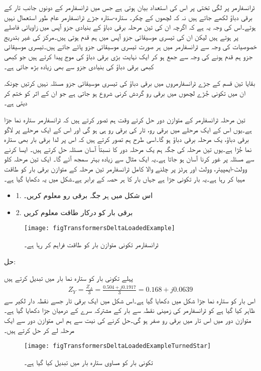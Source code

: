 	ٹرانسفارمر پر لگی تختی پر اس کی استعداد بیان ہوتی ہے جس میں ٹرانسفارمر کے دونوں جانب تار کے برقی دباؤ لکھے جاتے ہیں نہ کہ لچھوں کے چکر۔
%
ستارہ-ستارہ جڑے ٹرانسفارمر عام طور استعمال نہیں ہوتے۔اس کی وجہ یہ ہے کہ اگرچہ ان کی تین مرحلہ برقی دباؤ  کے بنیادی جزو آپس میں   زاویائی فاصلے پر ہوتے ہیں لیکن ان کی تیسری موسیقائی جزو آپس میں ہم قدم ہوتی ہیں۔مرکز کی غیر بتدریج خصوصیات کی وجہ سے ٹرانسفارمر میں ہر صورت تیسری موسیقائی جزو پائے جاتے ہیں۔تیسری موسیقائی جزو ہم قدم ہونے کی وجہ سے جمع ہو کر ایک نہایت بڑی برقی دباؤ کی موج پیدا کرتے ہیں جو کبھی کبھی برقی دباؤ کی بنیادی جزو سے بھی زیادہ بڑھ جاتی ہے۔

بقایا تین قسم کے جڑے ٹرانسفارمروں میں برقی دباؤ کی تیسری موسیقائی جزو مسئلہ نہیں کرتیں چونکہ ان میں تکونی جُڑے لچھوں میں برقی رو گردش کرنی شروع ہو جاتی ہے جو ان کے اثر کو ختم کر دیتی ہے۔

تین مرحلہ ٹرانسفارمر کے متوازن دور حل کرتے وقت ہم تصور کرتے ہیں کہ ٹرانسفارمر ستارہ نما جڑا  ہے۔یوں اس کے ایک مرحلے میں برقی رو، تار  کی برقی رو ہی ہو گی اور اس کے ایک مرحلے پر لاگو برقی دباؤ، یک مرحلہ برقی دباؤ  ہو گا۔اسی طرح ہم تصور کرتے ہیں کہ اس پر لدا برقی بار بھی ستارہ نما جُڑا ہے۔یوں تین مرحلہ کی جگہ ہم یک مرحلہ دور کا نسبتاً آسان مسئلہ حل کرتے ہیں۔ ایسا کرنے سے مسئلہ پر غور کرنا آسان ہو جاتا ہے۔یہ ایک مثال سے زیادہ بہتر سمجھ آئے گا۔
%
ایک تین مرحلہ     کلو وولٹ-ایمپیئر،    وولٹ اور  ہرٹز پر چلنے والا کامل ٹرانسفارمر تین مرحلہ کے متوازن برقی بار کو طاقت مہیا کر رہا ہے۔یہ بار تکونی جڑا ہے جہاں بار کا ہر حصہ  کے برابر ہے۔شکل   میں یہ دکھایا گیا ہے۔
\begin{itemize}
\item
1. اس شکل میں ہر جگہ برقی رو معلوم کریں۔
\item
2. برقی بار کو درکار طاقت معلوم کریں
\end{itemize}

\begin{figure}
\centering
\texttt{[image: figTransformersDeltaLoadedExample]}
\caption{ٹرانسفارمر تکونی متوازن بار کو طاقت فراہم کر رہا ہے۔}
\label{شکل_ٹرانسفارمر_تکونی_بار_کی_مثال}
\end{figure}
حل:

پہلے تکونی بار کو ستارہ نما بار میں تبدیل کرتے ہیں
\begin{align*}
Z_Y= \frac{Z_\Delta}{3}=\frac{0.504+j0.1917}{3}=0.168+j0.0639
\end{align*}
اس بار کو ستارہ نما جڑا شکل  میں دکھایا گیا ہے۔اس شکل میں ایک برقی تار جسے نقطہ دار لکیر سے ظاہر کیا گیا ہے کو ٹرانسفارمر کی زمینی نقطہ سے بار کے مشترکہ سرے کے درمیان جڑا دکھایا گیا ہے۔متوازن دور میں اس تار میں برقی رو صفر ہو گی۔حل کرنے کی نیت سے ہم اس متوازن دور سے ایک مرحلہ لے کر حل کرتے ہیں۔
\begin{figure}
\centering
\texttt{[image: figTransformersDeltaLoadedExampleTurnedStar]}
\caption{تکونی بار کو مساوی ستارہ بار میں تبدیل کیا گیا ہے۔}
\label{شکل_ٹرانسفارمر_تکونی_بار_کو_ستارہ_تبادلہ}
\end{figure}

